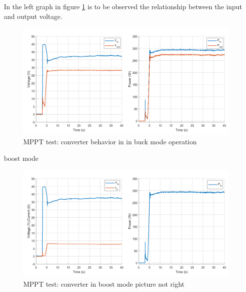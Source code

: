 In the left graph in figure \ref{MPPTtestbuckmode2} is to be observed the relationship between the input and output voltage.
 
\begin{figure}[H]
	\begin{center}
		\includegraphics[width=1\textwidth]{../Pictures/P1/Test/Buck_mode_MPPT_Vin_Vout_Pin_Pout}
		\caption{MPPT test: converter behavior in  in buck mode operation}
		\label{MPPTtestbuckmode2}
	\end{center}	
\end{figure}



boost mode

\begin{figure}[H]
	\begin{center}
		\includegraphics[width=1\textwidth]{../Pictures/P1/Test/Buck_mode_MPPT_Vin_Iin_Pin}
		\caption{MPPT test: converter in boost mode picture not right}
		\label{MPPTtestboostmode1}
	\end{center}	
\end{figure}

